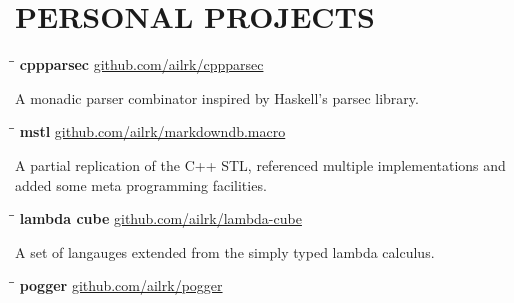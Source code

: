 \documentclass{res}
\begin{document}
\begin{resume}
\begin{itemize}[leftmargin=-.1in]
\end{itemize}

\vspace{-0.2in}
\section{PERSONAL PROJECTS}

    \vspace{-0.1in}
    \begin{tabbing}
        \hspace{2.4in}\= \hspace{0.9in}\= \kill
        {\bf cppparsec } \>               \>\url{github.com/ailrk/cppparsec}\\

    \end{tabbing}\vspace{-30pt}
    A monadic parser combinator inspired by Haskell's parsec library.

    \vspace{-0.2in}
    \begin{tabbing}
        \hspace{2.4in}\= \hspace{0.9in}\= \kill
        {\bf mstl } \>               \>\url{github.com/ailrk/markdowndb.macro}\\
    \end{tabbing}\vspace{-30pt}
    A partial replication of the C++ STL, referenced multiple implementations and added some meta programming facilities.


    \vspace{-0.2in}
    \begin{tabbing}
        \hspace{2.4in}\= \hspace{0.9in}\= \kill
        {\bf lambda cube} \>               \>\url{github.com/ailrk/lambda-cube}\\

    \end{tabbing}\vspace{-30pt}
    A set of langauges extended from the simply typed lambda calculus.

    \vspace{-0.2in}
    \begin{tabbing}
        \hspace{2.4in}\= \hspace{0.9in}\= \kill
        {\bf pogger } \>               \>\url{github.com/ailrk/pogger}\\


\end{tabbing}
\end{resume}
\end{document}
